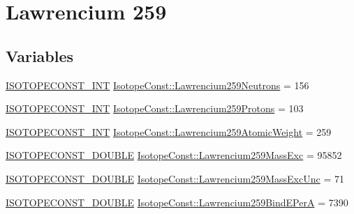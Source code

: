 \hypertarget{group___isotope_const-_lawrencium-_lr259}{}\section{Lawrencium 259}
\label{group___isotope_const-_lawrencium-_lr259}
\subsection*{Variables}
\begin{DoxyCompactItemize}
\item 
\mbox{\hyperlink{group___isotope_const-_macros_ga5f18360b3e99483a35c32d789e62621c}{I\+S\+O\+T\+O\+P\+E\+C\+O\+N\+S\+T\+\_\+\+I\+NT}} \mbox{\hyperlink{group___isotope_const-_lawrencium-_lr259_gaccb0e0e75b8af6b4ca7b0b58260ce96a}{Isotope\+Const\+::\+Lawrencium259\+Neutrons}} = 156
\item 
\mbox{\hyperlink{group___isotope_const-_macros_ga5f18360b3e99483a35c32d789e62621c}{I\+S\+O\+T\+O\+P\+E\+C\+O\+N\+S\+T\+\_\+\+I\+NT}} \mbox{\hyperlink{group___isotope_const-_lawrencium-_lr259_gabeeb05a5571ddce417ed84f495aa0942}{Isotope\+Const\+::\+Lawrencium259\+Protons}} = 103
\item 
\mbox{\hyperlink{group___isotope_const-_macros_ga5f18360b3e99483a35c32d789e62621c}{I\+S\+O\+T\+O\+P\+E\+C\+O\+N\+S\+T\+\_\+\+I\+NT}} \mbox{\hyperlink{group___isotope_const-_lawrencium-_lr259_gaa89587a0f77e06d5c8cc6c7a11b0140a}{Isotope\+Const\+::\+Lawrencium259\+Atomic\+Weight}} = 259
\item 
\mbox{\hyperlink{group___isotope_const-_macros_ga8f45a7272ce02c0b4c65c44636ed719a}{I\+S\+O\+T\+O\+P\+E\+C\+O\+N\+S\+T\+\_\+\+D\+O\+U\+B\+LE}} \mbox{\hyperlink{group___isotope_const-_lawrencium-_lr259_ga8f9a546df5ec567bb4a165234012998f}{Isotope\+Const\+::\+Lawrencium259\+Mass\+Exc}} = 95852
\item 
\mbox{\hyperlink{group___isotope_const-_macros_ga8f45a7272ce02c0b4c65c44636ed719a}{I\+S\+O\+T\+O\+P\+E\+C\+O\+N\+S\+T\+\_\+\+D\+O\+U\+B\+LE}} \mbox{\hyperlink{group___isotope_const-_lawrencium-_lr259_ga6782bceb8843c4dc163d80bfbe19b669}{Isotope\+Const\+::\+Lawrencium259\+Mass\+Exc\+Unc}} = 71
\item 
\mbox{\hyperlink{group___isotope_const-_macros_ga8f45a7272ce02c0b4c65c44636ed719a}{I\+S\+O\+T\+O\+P\+E\+C\+O\+N\+S\+T\+\_\+\+D\+O\+U\+B\+LE}} \mbox{\hyperlink{group___isotope_const-_lawrencium-_lr259_ga0d32745504d4ee950ba034310b5e9ea4}{Isotope\+Const\+::\+Lawrencium259\+Bind\+E\+PerA}} = 7390
\item 

\end{DoxyCompactItemize}
